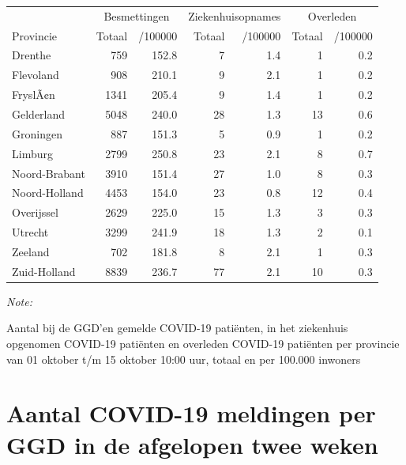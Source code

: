 \documentclass[
  english,
  man,floatsintext]{apa6}
\begin{document}
\begin{table}
\centering
\begin{threeparttable}
\begin{tabular}{lrrrrrr}
\toprule
\multicolumn{1}{c}{ } & \multicolumn{2}{c}{Besmettingen} & \multicolumn{2}{c}{Ziekenhuisopnames} & \multicolumn{2}{c}{Overleden} \\
\cmidrule(l{3pt}r{3pt}){2-3} \cmidrule(l{3pt}r{3pt}){4-5} \cmidrule(l{3pt}r{3pt}){6-7}
Provincie & Totaal & /100000 & Totaal & /100000 & Totaal & /100000\\
\midrule
Drenthe & 759 & 152.8 & 7 & 1.4 & 1 & 0.2\\
Flevoland & 908 & 210.1 & 9 & 2.1 & 1 & 0.2\\
FryslÃ¢n & 1341 & 205.4 & 9 & 1.4 & 1 & 0.2\\
Gelderland & 5048 & 240.0 & 28 & 1.3 & 13 & 0.6\\
Groningen & 887 & 151.3 & 5 & 0.9 & 1 & 0.2\\
Limburg & 2799 & 250.8 & 23 & 2.1 & 8 & 0.7\\
Noord-Brabant & 3910 & 151.4 & 27 & 1.0 & 8 & 0.3\\
Noord-Holland & 4453 & 154.0 & 23 & 0.8 & 12 & 0.4\\
Overijssel & 2629 & 225.0 & 15 & 1.3 & 3 & 0.3\\
Utrecht & 3299 & 241.9 & 18 & 1.3 & 2 & 0.1\\
Zeeland & 702 & 181.8 & 8 & 2.1 & 1 & 0.3\\
Zuid-Holland & 8839 & 236.7 & 77 & 2.1 & 10 & 0.3\\
\bottomrule
\end{tabular}
\begin{tablenotes}
\item \textit{Note: } 
\item Aantal bij de GGD’en gemelde COVID-19 patiënten, in het ziekenhuis opgenomen COVID-19 patiënten en overleden COVID-19 patiënten per provincie van 01 oktober t/m 15 oktober 10:00 uur, totaal en per 100.000 inwoners
\end{tablenotes}
\end{threeparttable}
\end{table}

\newpage

\hypertarget{aantal-covid-19-meldingen-per-ggd-in-de-afgelopen-twee-weken}{%
\section{Aantal COVID-19 meldingen per GGD in de afgelopen twee weken}\label{aantal-covid-19-meldingen-per-ggd-in-de-afgelopen-twee-weken}}
\end{document}
